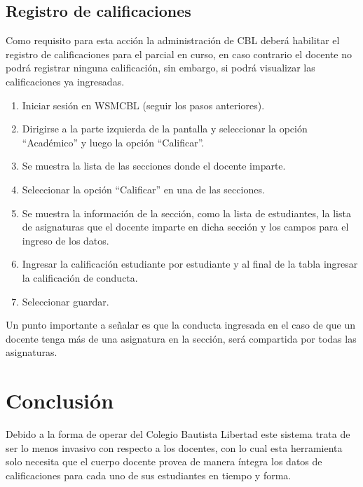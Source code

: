 \documentclass[12pt]{article}
\begin{document}
    \subsection{Registro de calificaciones}
    Como requisito para esta acción la administración de CBL deberá habilitar el registro de calificaciones para
    el parcial en curso, en caso contrario el docente no podrá registrar ninguna calificación, sin embargo, si podrá visualizar las calificaciones ya ingresadas.

    \begin{enumerate}
        \item Iniciar sesión en WSMCBL (seguir los pasos anteriores).
        \item Dirigirse a la parte izquierda de la pantalla y seleccionar la opción ``Académico'' y luego la opción ``Calificar''.
        \item Se muestra la lista de las secciones donde el docente imparte.
        \item Seleccionar la opción ``Calificar'' en una de las secciones.
        \item Se muestra la información de la sección, como la lista de estudiantes, la lista de asignaturas que el docente imparte en dicha sección y los campos para el ingreso de los datos.
        \item Ingresar la calificación estudiante por estudiante y al final de la tabla ingresar la calificación de conducta.
        \item Seleccionar guardar.
    \end{enumerate}

    Un punto importante a señalar es que la conducta ingresada en el caso de que un docente tenga más de una asignatura en la sección, será compartida por todas las asignaturas.

    \section{Conclusión}

    Debido a la forma de operar del Colegio Bautista Libertad este sistema trata de ser lo menos invasivo con respecto
    a los docentes, con lo cual esta herramienta solo necesita que el cuerpo docente provea de manera íntegra los datos de calificaciones para cada uno de sus estudiantes en tiempo y forma.
\end{document}
